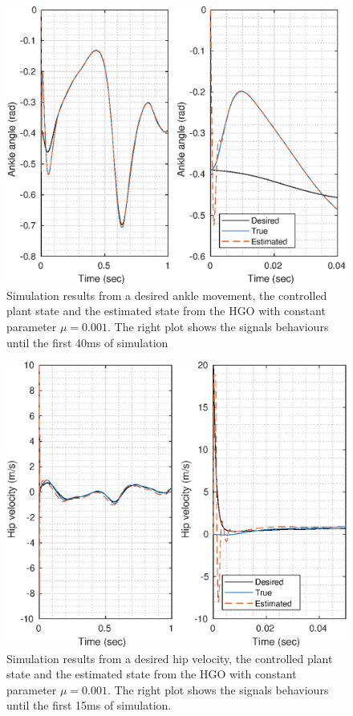 \documentclass[letterpaper, 10 pt, journal, twocolumn]{IEEEtran}  %
\theoremstyle{plain}
\theoremstyle{definition}
\theoremstyle{remark}
\begin{document}
%
%
\begin{figure}[h!]
	\begin{center}
	\includegraphics[width = 13cm]{Figs/q_ankle_mu_1e-03.eps}
	\caption{ Simulation results from a desired ankle movement, the controlled plant state and the estimated state from the HGO with constant parameter $\mu=0.001$. The right plot shows the signals behaviours until the first 40ms of simulation}
	\label{fig:ankle}
	\end{center}
\end{figure}
%
%
%
%
\begin{figure}[h!]
	\begin{center}
	\includegraphics[width = 13cm]{Figs/dq_hip_mu_1e-03.eps}
	\caption{ Simulation results from a desired hip velocity, the controlled plant state and the estimated state from the HGO with constant parameter $\mu=0.001$. The right plot shows the signals behaviours until the first 15ms of simulation.}
	\label{fig:dhip}
	\end{center}
\end{figure}
\end{document}
